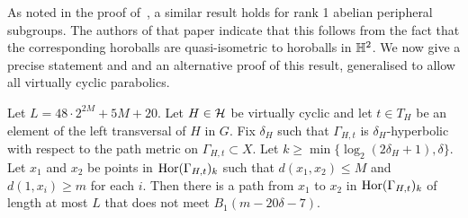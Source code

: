 As noted in the proof of~\cite[Lemma 2.16]{dahmanigroves08a}, a similar result holds for rank 1 abelian peripheral subgroups. 
The authors of that paper indicate that this follows from the fact that the corresponding horoballs are quasi-isometric to horoballs in $\mathbb{H}^2$.
We now give a precise statement and and an alternative proof of this result, generalised to allow all virtually cyclic parabolics.

\begin{proposition}
  \label{proposition:double_dagger_thin_virtually_cyclic}
  Let $L = 48\cdot2^{2M} + 5M + 20$.
  Let $H \in \mathcal{H}$ be virtually cyclic and let $t \in T_H$ be an element of the left transversal of $H$ in $G$.
  Fix $\delta_H$ such that $\Gamma_{H,t}$ is $\delta_H$-hyperbolic with respect to the path metric on $\Gamma_{H,t} \subset X$.
  Let $k \geq \min\{\log_2(2\delta_H+1),\delta\}$.
  Let $x_1$ and $x_2$ be points in $\operatorname{Hor}(\Gamma_{H,t})_k$ such that $d(x_1, x_2) \leq M$ and $d(1,x_i) \geq m$ for each $i$.
  Then there is a path from $x_1$ to $x_2$ in $\operatorname{Hor}(\Gamma_{H,t})_k$ of length at most $L$ that does not meet $B_1(m - 20\delta - 7)$.
\end{proposition}

